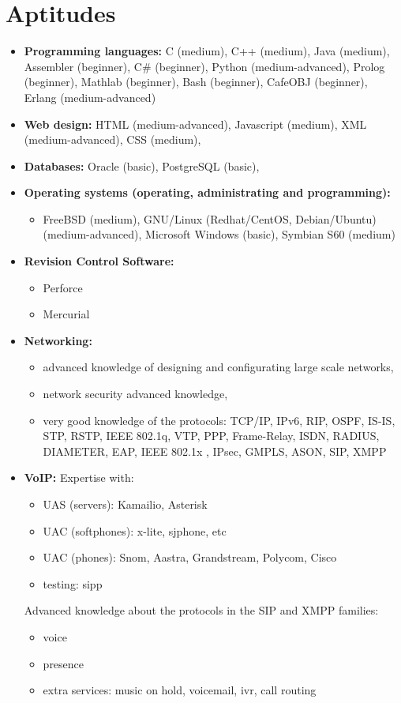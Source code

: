 \documentclass[a4paper,12pt,openany]{article}
\begin{document}
\section{Aptitudes}
	\begin{itemize}
	 	\item \textbf{Programming languages: } C (medium), C++ (medium), Java (medium), Assembler (beginner), C\# (beginner), Python (medium-advanced), Prolog (beginner), Mathlab (beginner), Bash (beginner), CafeOBJ (beginner), Erlang (medium-advanced)
		\item \textbf{Web design:} HTML (medium-advanced), Javascript (medium), XML (medium-advanced), CSS (medium),
		\item \textbf{Databases:} Oracle (basic), PostgreSQL (basic),
		\item \textbf{Operating systems (operating, administrating and programming): }
			\begin{itemize}
			 	\item FreeBSD (medium), GNU/Linux (Redhat/CentOS, Debian/Ubuntu) (medium-advanced), Microsoft Windows (basic), Symbian S60 (medium)
			\end{itemize}

		\item \textbf{Revision Control Software:}
			\begin{itemize}
				\item Perforce
				\item Mercurial
			\end{itemize}

		\item \textbf{Networking:}
			\begin{itemize}
			 	\item advanced knowledge of designing and configurating large scale networks, 
				\item network security advanced knowledge, 
				\item very good knowledge of the protocols: TCP/IP, IPv6, RIP, OSPF, IS-IS, STP, RSTP, IEEE 802.1q, VTP, PPP, Frame-Relay, ISDN, RADIUS, DIAMETER, EAP, IEEE 802.1x , IPsec, GMPLS, ASON, SIP, XMPP
			\end{itemize}

		\item \textbf{VoIP:}
			Expertise with:
			\begin{itemize}
				\item UAS (servers): Kamailio, Asterisk
				\item UAC (softphones): x-lite, sjphone, etc
				\item UAC (phones): Snom, Aastra, Grandstream, Polycom, Cisco
				\item testing: sipp 
			\end{itemize}

			Advanced knowledge about the protocols in the SIP and XMPP families:
			\begin{itemize}
				\item voice
				\item presence
				\item extra services: music on hold, voicemail, ivr, call routing  
			\end{itemize}			

	\end{itemize}
\end{document}

